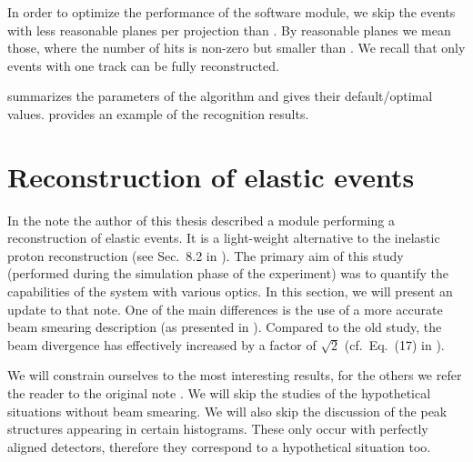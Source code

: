 
In order to optimize the performance of the software module, we skip the events with less reasonable planes per projection than . By reasonable planes we mean those, where the number of hits is non-zero but smaller than . We recall that only events with one track can be fully reconstructed.

 summarizes the parameters of the algorithm and gives their default/optimal values.  provides an example of the recognition results.



\eject %
\section[elr]{Reconstruction of elastic events}

In the note  the author of this thesis described a module performing a reconstruction of elastic events. It is a light-weight alternative to the inelastic proton reconstruction (see Sec.~8.2 in ). The primary aim of this study (performed during the simulation phase of the experiment) was to quantify the capabilities of the  system with various optics. In this section, we will present an update to that note. One of the main differences is the use of a more accurate beam smearing description (as presented in ). Compared to the old study, the beam divergence has effectively increased by a factor of $\sqrt 2$ (cf.~Eq.~(17) in ).

We will constrain ourselves to the most interesting results, for the others we refer the reader to the original note . We will skip the studies of the hypothetical situations without beam smearing. We will also skip the discussion of the peak structures appearing in certain histograms. These only occur with perfectly aligned detectors, therefore they correspond to a hypothetical situation too.

